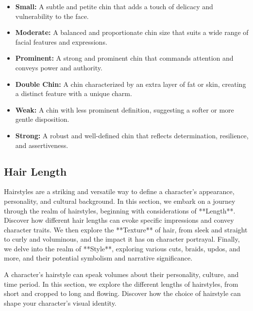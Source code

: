 \documentclass[12pt]{book}  %
\begin{document}
\begin{itemize}
    \item \textbf{Small:} A subtle and petite chin that adds a touch of delicacy and vulnerability to the face.
    \item \textbf{Moderate:} A balanced and proportionate chin size that suits a wide range of facial features and expressions.
    \item \textbf{Prominent:} A strong and prominent chin that commands attention and conveys power and authority.
    \item \textbf{Double Chin:} A chin characterized by an extra layer of fat or skin, creating a distinct feature with a unique charm.
    \item \textbf{Weak:} A chin with less prominent definition, suggesting a softer or more gentle disposition.
    \item \textbf{Strong:} A robust and well-defined chin that reflects determination, resilience, and assertiveness.
\end{itemize}

\subsection{\textbf{Hair Length}}

Hairstyles are a striking and versatile way to define a character's appearance, personality, and cultural background. In this section, we embark on a journey through the realm of hairstyles, beginning with considerations of **Length**. Discover how different hair lengths can evoke specific impressions and convey character traits. We then explore the **Texture** of hair, from sleek and straight to curly and voluminous, and the impact it has on character portrayal. Finally, we delve into the realm of **Style**, exploring various cuts, braids, updos, and more, and their potential symbolism and narrative significance.

A character's hairstyle can speak volumes about their personality, culture, and time period. In this section, we explore the different lengths of hairstyles, from short and cropped to long and flowing. Discover how the choice of hairstyle can shape your character's visual identity.
\end{document}
